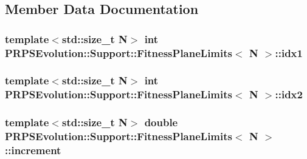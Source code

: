 \subsection{\-Member \-Data \-Documentation}
\hypertarget{struct_p_r_p_s_evolution_1_1_support_1_1_fitness_plane_limits_acd363eaaed93d365ecfff41fea11faa7}{
\subsubsection[{idx1}]{\setlength{\rightskip}{0pt plus 5cm}template$<$std\-::size\-\_\-t \-N$>$ int {\bf \-P\-R\-P\-S\-Evolution\-::\-Support\-::\-Fitness\-Plane\-Limits}$<$ \-N $>$\-::{\bf idx1}}}\label{struct_p_r_p_s_evolution_1_1_support_1_1_fitness_plane_limits_acd363eaaed93d365ecfff41fea11faa7}
\hypertarget{struct_p_r_p_s_evolution_1_1_support_1_1_fitness_plane_limits_a374fd9e0855ef663a457a99492a9529f}{
\subsubsection[{idx2}]{\setlength{\rightskip}{0pt plus 5cm}template$<$std\-::size\-\_\-t \-N$>$ int {\bf \-P\-R\-P\-S\-Evolution\-::\-Support\-::\-Fitness\-Plane\-Limits}$<$ \-N $>$\-::{\bf idx2}}}\label{struct_p_r_p_s_evolution_1_1_support_1_1_fitness_plane_limits_a374fd9e0855ef663a457a99492a9529f}
\hypertarget{struct_p_r_p_s_evolution_1_1_support_1_1_fitness_plane_limits_a17db1abd8c16e3f2bbc0bd18801be04f}{
\subsubsection[{increment}]{\setlength{\rightskip}{0pt plus 5cm}template$<$std\-::size\-\_\-t \-N$>$ double {\bf \-P\-R\-P\-S\-Evolution\-::\-Support\-::\-Fitness\-Plane\-Limits}$<$ \-N $>$\-::{\bf increment}}}\label{struct_p_r_p_s_evolution_1_1_support_1_1_fitness_plane_limits_a17db1abd8c16e3f2bbc0bd18801be04f}
